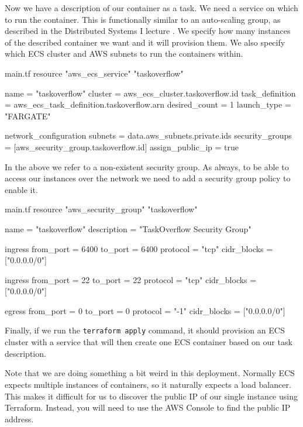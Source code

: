 \documentclass{csse4400}
\begin{document}
Now we have a description of our container as a task.
We need a service on which to run the container.
This is functionally similar to an auto-scaling group, as described in the Distributed Systems I lecture \cite{distributed1-slides}.
We specify how many instances of the described container we want and it will provision them.
We also specify which ECS cluster and AWS subnets to run the containers within.

\begin{code}[language=terraform,numbers=none]{main.tf}
resource "aws_ecs_service" "taskoverflow" {
    name            = "taskoverflow"
    cluster         = aws_ecs_cluster.taskoverflow.id
    task_definition = aws_ecs_task_definition.taskoverflow.arn
    desired_count   = 1
    launch_type     = "FARGATE"
  
    network_configuration {
      subnets             = data.aws_subnets.private.ids
      security_groups     = [aws_security_group.taskoverflow.id]
      assign_public_ip    = true
    }
}
\end{code}

In the above we refer to a non-existent security group.
As always, to be able to access our instances over the network we need to add a security group policy to enable it.

\begin{code}[language=terraform,numbers=none]{main.tf}
resource "aws_security_group" "taskoverflow" {
    name = "taskoverflow"
    description = "TaskOverflow Security Group"
  
    ingress {
      from_port = 6400
      to_port = 6400
      protocol = "tcp"
      cidr_blocks = ["0.0.0.0/0"]
    }
  
    ingress {
      from_port = 22
      to_port = 22
      protocol = "tcp"
      cidr_blocks = ["0.0.0.0/0"]
    }
  
    egress {
      from_port = 0
      to_port = 0
      protocol = "-1"
      cidr_blocks = ["0.0.0.0/0"]
    }
}
\end{code}

Finally, if we run the \texttt{terraform apply} command,
it should provision an ECS cluster with a service that will then create one ECS container based on our task description.

Note that we are doing something a bit weird in this deployment.
Normally ECS expects multiple instances of containers,
so it naturally expects a load balancer.
This makes it difficult for us to discover the public IP of our single instance using Terraform.
Instead, you will need to use the AWS Console to find the public IP address.
\end{document}
